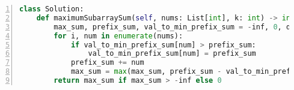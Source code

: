 \begin{figure*}
\centering
\begin{lstlisting}[breaklines=true, language=Python, frame=shadowbox, numbers=left,]
class Solution:
    def maximumSubarraySum(self, nums: List[int], k: int) -> int:
        max_sum, prefix_sum, val_to_min_prefix_sum = -inf, 0, defaultdict(lambda: inf)
        for i, num in enumerate(nums):
            if val_to_min_prefix_sum[num] > prefix_sum:
                val_to_min_prefix_sum[num] = prefix_sum
            prefix_sum += num
            max_sum = max(max_sum, prefix_sum - val_to_min_prefix_sum[num + k], prefix_sum - val_to_min_prefix_sum[num - k])
        return max_sum if max_sum > -inf else 0 
\end{lstlisting}
\label{lst:python-being-wrongly-pseudogen}
\end{figure*}
